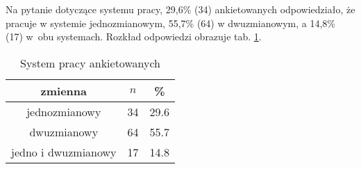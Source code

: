 Na pytanie dotyczące systemu pracy, 29,6\% (34) ankietowanych odpowiedziało, że pracuje w systemie jednozmianowym, 55,7\% (64) w dwuzmianowym, a 14,8\% (17) w~obu systemach. Rozkład odpowiedzi obrazuje tab. \ref{tab:Q4}.

\begin{table}[H]
\caption{System pracy ankietowanych}
\centering
\begin{tabular}{ | c | c | c |}
\hline
zmienna & $n$ & \% \\
\hline
jednozmianowy  &  34  & 29.6 \\
\hline
dwuzmianowy  &  64  & 55.7 \\
\hline
jedno i dwuzmianowy  &  17  & 14.8 \\
\hline
\end{tabular}
\label{tab:Q4}
\end{table}


